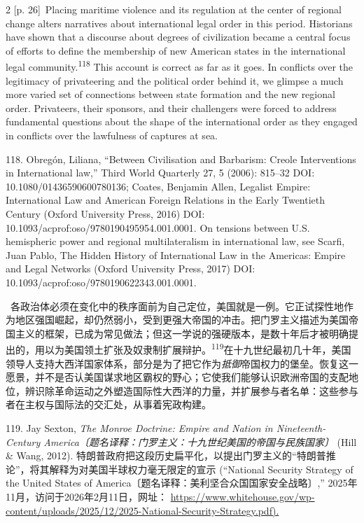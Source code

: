 \documentclass[10pt,a4paper]{article}
\begin{document}
\begin{paracol}{2}
\switchcolumn
{\scriptsize\color{gray} [p. 26]}\ Placing maritime violence and its regulation at the center of regional change alters narratives about international legal order in this period. Historians have shown that a discourse about degrees of civilization became a central focus of efforts to define the membership of new American states in the international legal community.\nobreak\textsuperscript{118} This account is correct as far as it goes. In conflicts over the legitimacy of privateering and the political order behind it, we glimpse a much more varied set of connections between state formation and the new regional order. Privateers, their sponsors, and their challengers were forced to address fundamental questions about the shape of the international order as they engaged in conflicts over the lawfulness of captures at sea.\par{\small 118. Obregón, Liliana, “Between Civilisation and Barbarism: Creole Interventions in International law,” Third World Quarterly 27, 5 (2006): 815–32 DOI: 10.1080/01436590600780136; Coates, Benjamin Allen, Legalist Empire: International Law and American Foreign Relations in the Early Twentieth Century (Oxford University Press, 2016) DOI: 10.1093/acprof:oso/9780190495954.001.0001. On tensions between U.S. hemispheric power and regional multilateralism in international law, see Scarfi, Juan Pablo, The Hidden History of International Law in the Americas: Empire and Legal Networks (Oxford University Press, 2017) DOI: 10.1093/acprof:oso/9780190622343.001.0001.\par}
\switchcolumn*
{\scriptsize\color{gray} [p. 26]}\ 各政治体必须在变化中的秩序面前为自己定位，美国就是一例。它正试探性地作为地区强国崛起，却仍然弱小，受到更强大帝国的冲击。把门罗主义描述为美国帝国主义的框架，已成为常见做法；但这一学说的强硬版本，是数十年后才被明确提出的，用以为美国领土扩张及奴隶制扩展辩\mbox{护。\textsuperscript{119}}在十九世纪最初几十年，美国领导人支持大西洋国家体系，部分是为了把它作为\textit{抵御}帝国权力的堡垒。恢复这一愿景，并不是否认美国谋求地区霸权的野心；它使我们能够认识欧洲帝国的支配地位，辨识除革命运动之外塑造国际性大西洋的力量，并扩展参与者名单：这些参与者在主权与国际法的交汇处，从事着宪政构建。\par{\small 119. Jay Sexton, \textit{The Monroe Doctrine: Empire and Nation in Nineteenth-Century America〔题名译释：门罗主义：十九世纪美国的帝国与民族国家〕} (Hill \& Wang, 2012). 特朗普政府把这段历史扁平化，以提出门罗主义的“特朗普推论”，将其解释为对美国半球权力毫无限定的宣示 (“National Security Strategy of the United States of America〔题名译释：美利坚合众国国家安全战略〕,” 2025年11月，访问于2026年2月11日，网址： \url{https://www.whitehouse.gov/wp-content/uploads/2025/12/2025-National-Security-Strategy.pdf).}\par}

\end{paracol}
\end{document}
